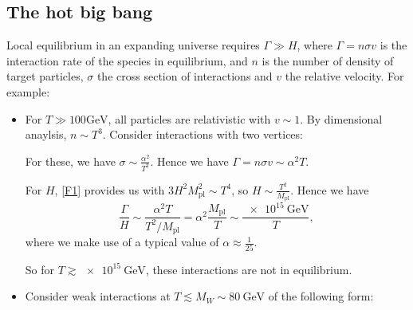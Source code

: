 \documentclass{jknotes}
\begin{document}
\subsection{The hot big bang}
Local equilibrium in an expanding universe requires \(\Gamma \gg H\), where \(\Gamma = n \sigma v\) is the interaction rate of the species in equilibrium, and \(n\) is the number of density of target particles, \(\sigma\) the cross section of interactions and \(v\) the relative velocity. For example:
\begin{itemize}
    \item For \(T \gg 100\si{\giga\eV}\), all particles are relativistic with \(v \sim 1\). By dimensional anaylsis, \(n \sim T^3\). Consider interactions with two vertices:
        \begin{figure}[H]
            \centering
        \end{figure}
        For these, we have \(\sigma \sim \frac{\alpha^2}{T^2}\). Hence we have \(\Gamma = n \sigma v \sim \alpha^2 T\).

        For \(H\), \eqref{F1} provides us with \(3H^2M_{\text{pl}}^2 \sim T^4\), so \(H \sim \frac{T^2}{M_{\text{pl}}}\). Hence we have
        \begin{equation}
            \frac{\Gamma}{H} \sim \frac{\alpha^2 T}{T^2/M_{\text{pl}}} = \alpha^2\frac{M_{\text{pl}}}{T} \sim \frac{\SI{e15}{\giga\eV}}{T},
        \end{equation}
        where we make use of a typical value of \(\alpha \approx \frac1{25}\).

        So for \(T\gtrsim \SI{e15}{\giga\eV}\), these interactions are not in equilibrium.
    \item Consider weak interactions at \(T\lesssim M_W\sim \SI{80}{\giga\eV}\) of the following form:
        \begin{figure}[H]
            \centering
\end{figure}
\end{itemize}
\end{document}
